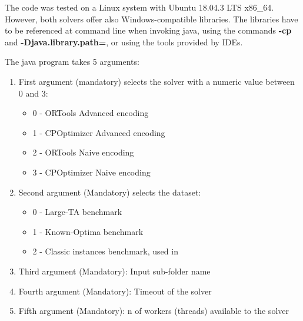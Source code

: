 \documentclass{article}
\begin{document}
The code was tested on a Linux system with Ubuntu 18.04.3 LTS x86\_64. However, both solvers offer also Windows-compatible libraries. The libraries have to be referenced at command line when invoking java, using the commands \textbf{-cp} and \textbf{-Djava.library.path=}, or using the tools provided by IDEs. 

The java program takes 5 arguments:
\begin{enumerate}
    \item First argument (mandatory) selects the solver with a numeric value between 0 and 3:
    \begin{itemize}
        \item 0 - ORTools Advanced encoding
        \item 1 - CPOptimizer Advanced encoding
        \item 2 - ORTools Naive encoding
        \item 3 - CPOptimizer Naive encoding
    \end{itemize}
		\item Second argument (Mandatory) selects the dataset:
		\begin{itemize}
        \item 0 - Large-TA benchmark
        \item 1 - Known-Optima benchmark
        \item 2 - Classic instances benchmark, used in \cite{dacol2019cp,dacol2019iclp}
    \end{itemize}
		\item Third argument (Mandatory): Input sub-folder name
	    \item Fourth argument (Mandatory): Timeout of the solver
		\item Fifth argument (Mandatory): n of workers (threads) available to the solver
\end{enumerate}



\end{document}
